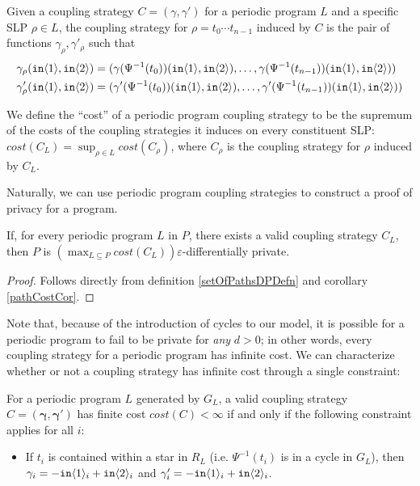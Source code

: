 \begin{defn}\label{svInducedCouplingStrategy}
    Given a coupling strategy $C = (\gamma, \gamma')$ for a periodic program $L$ and a specific SLP $\rho\in L$, the coupling strategy for $\rho=t_0\cdots t_{n-1}$ induced by $C$ is the pair of functions $\gamma_\rho, \gamma'_\rho$ such that 
    \begin{align*}
        \gamma_\rho(\texttt{in}\langle1 \rangle, \texttt{in}\langle2 \rangle) &= (\gamma(\Psi^{-1}(t_0))(\texttt{in}\langle1 \rangle, \texttt{in}\langle2 \rangle), \ldots,\gamma(\Psi^{-1}(t_{n-1}))(\texttt{in}\langle1 \rangle, \texttt{in}\langle2 \rangle) )\\
        \gamma'_\rho(\texttt{in}\langle1 \rangle, \texttt{in}\langle2 \rangle) &= (\gamma'(\Psi^{-1}(t_0))(\texttt{in}\langle1 \rangle, \texttt{in}\langle2 \rangle),\ldots,\gamma'(\Psi^{-1}(t_{n-1}))(\texttt{in}\langle1 \rangle, \texttt{in}\langle2 \rangle) )
    \end{align*}
\end{defn}

We define the ``cost'' of a periodic program coupling strategy to be the supremum of the costs of the coupling strategies it induces on every constituent SLP: $cost(C_L) = \sup_{\rho\in L}cost(C_\rho)$, where $C_\rho$ is the coupling strategy for $\rho$ induced by $C_L$. 

Naturally, we can use periodic program coupling strategies to construct a proof of privacy for a program.

\begin{lemma}
    If, for every periodic program $L$ in $P$, there exists a valid coupling strategy $C_L$, then $P$ is $(\max_{L\subseteq P} cost(C_L))\varepsilon$-differentially private.
\end{lemma}

\begin{proof}
    Follows directly from definition \ref{setOfPathsDPDefn} and corollary \ref{pathCostCor}.
\end{proof}


Note that, because of the introduction of cycles to our model, it is possible for a periodic program to fail to be private for \textit{any} $d>0$; in other words, every coupling strategy for a periodic program has infinite cost. We can characterize whether or not a coupling strategy has infinite cost through a single constraint:

\begin{lemma}\label{finiteCostConstraintLemma}
    For a periodic program $L$ generated by $G_L$, a valid coupling strategy $C = (\mathbf{\gamma}, \mathbf{\gamma}')$ has finite cost $cost(C)<\infty$ if and only if the following constraint applies for all $i$:
    \begin{itemize}
        \item If $t_i$ is contained within a star in $R_L$ (i.e. $\Psi^{-1}(t_i)$ is in a cycle in $G_L$), then $\gamma_i = -\texttt{in}\langle1 \rangle_i+\texttt{in}\langle2 \rangle_i$ and $\gamma_i' = -\texttt{in}\langle1 \rangle_i+\texttt{in}\langle2 \rangle_i$.
    \end{itemize}
\end{lemma}

